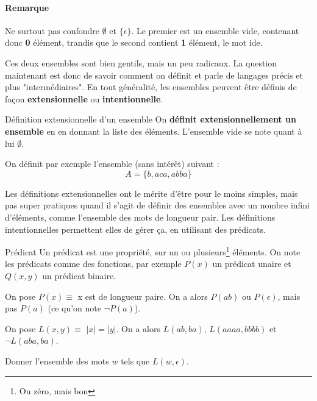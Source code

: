 \paragraph{Remarque} Ne surtout pas confondre $\emptyset$ et $\{\epsilon\}$. Le premier est un ensemble vide, contenant donc \textbf{0} élément, trandis que le second contient \textbf{1} élément, le mot ide. 

Ces deux ensembles sont bien gentils, mais un peu radicaux. La question maintenant est donc de savoir comment on définit et parle de langages précis et plus "intermédiaires". En tout généralité, les ensembles peuvent être définis de façon \textbf{extensionnelle} ou \textbf{intentionnelle}. 

\begin{definition}{Définition extensionnelle d'un ensemble}{}
On \textbf{définit extensionnellement un ensemble} en en donnant la liste des éléments. L'ensemble vide se note quant à lui $\emptyset$.
\end{definition}

\begin{example} On définit par exemple l'ensemble (sans intérêt) suivant :
\[
    A = \{b, aca, abba\}
\]
\end{example}

Les définitions extensionnelles ont le mérite d'être pour le moins simples, mais pas super pratiques quand il s'agit de définir des ensembles avec un nombre infini d'éléments, comme l'ensemble des mots de longueur pair. Les définitions intentionnelles permettent elles de gérer ça, en utilisant des prédicats.

\begin{definition}{Prédicat}{}
Un prédicat est une propriété, sur un ou plusieurs\footnote{Ou zéro, mais bon} éléments. On note les prédicats comme des fonctions, par exemple $P(x)$ un prédicat unaire et $Q(x,y)$ un prédicat binaire.
\end{definition}

\begin{example}
On pose $P(x) \equiv$ x est de longueur paire. On a alors $P(ab)$ ou $P(\epsilon)$, mais pas $P(a)$ (ce qu'on note $\neg P(a)$). 
\end{example}

\begin{example}
\label{predL}
On pose $L(x,y) \equiv$ $|x| = |y|$. On a alors $L(ab,ba)$, $L(aaaa,bbbb)$ et $\neg L(aba,ba)$.
\end{example}

\begin{exercice}
Donner l'ensemble des mots $w$ tels que $L(w,\epsilon)$. 
\end{exercice}

